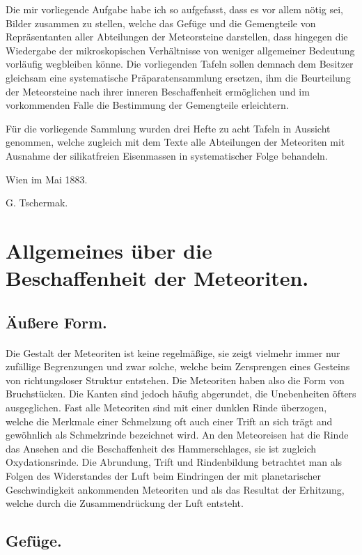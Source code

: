 \documentclass[a4paper, 11pt, oneside, polutonikogreek, german]{article}
\begin{document}
Die mir vorliegende Aufgabe habe ich so aufgefasst, dass es vor allem nötig sei, Bilder zusammen zu stellen, welche das Gefüge und die Gemengteile von Repräsentanten aller Abteilungen der Meteorsteine darstellen, dass hingegen die Wiedergabe der mikroskopischen Verhältnisse von weniger allgemeiner Bedeutung vorläufig wegbleiben könne. Die vorliegenden Tafeln sollen demnach dem Besitzer gleichsam eine systematische Präparatensammlung ersetzen, ihm die Beurteilung der Meteorsteine nach ihrer inneren Beschaffenheit ermöglichen und im vorkommenden Falle die Bestimmung der Gemengteile erleichtern.

Für die vorliegende Sammlung wurden drei Hefte zu acht Tafeln in Aussicht genommen, welche zugleich mit dem Texte alle Abteilungen der Meteoriten mit Ausnahme der silikatfreien Eisenmassen in systematischer Folge behandeln.

Wien im Mai 1883.

G. Tschermak.
\clearpage
\section{Allgemeines über die Beschaffenheit der Meteoriten.}
\subsection{Äußere Form.}
\paragraph*{}
Die Gestalt der Meteoriten ist keine regelmäßige, sie zeigt vielmehr immer nur zufällige Begrenzungen und zwar solche, welche beim Zersprengen eines Gesteins von richtungsloser Struktur entstehen. Die Meteoriten haben also die Form von Bruchstücken. Die Kanten sind jedoch häufig abgerundet, die Unebenheiten öfters ausgeglichen. Fast alle Meteoriten sind mit einer dunklen Rinde überzogen, welche die Merkmale einer Schmelzung oft auch einer Trift an sich trägt and gewöhnlich als Schmelzrinde bezeichnet wird. An den Meteoreisen hat die Rinde das Ansehen and die Beschaffenheit des Hammerschlages, sie ist zugleich Oxydationsrinde. Die Abrundung, Trift und Rindenbildung betrachtet man als Folgen des Widerstandes der Luft beim Eindringen der mit planetarischer Geschwindigkeit ankommenden Meteoriten und als das Resultat der Erhitzung, welche durch die Zusammendrückung der Luft entsteht.

\subsection{Gefüge.}
\end{document}
